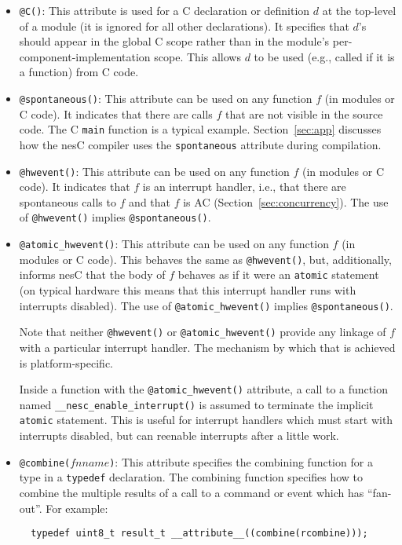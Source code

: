 \documentclass[11pt,letterpaper]{article}
\newcommand{\kw}[1]{{\tt #1}}
\newcommand{\code}[1]{{\tt #1}}
\newcommand{\nesc}{nesC\xspace}
\begin{document}
\begin{itemize}
\item \code{@C()}: This attribute is used for a C declaration or definition
$d$ at the top-level of a module (it is ignored for all other
declarations). It specifies that $d$'s should appear in the global C scope
rather than in the module's per-component-implementation scope. This allows
$d$ to be used (e.g., called if it is a function) from C code.

\item \code{@spontaneous()}: This attribute can be used on any function $f$
(in modules or C code). It indicates that there are calls $f$ that are not
visible in the source code. The C \code{main} function is a typical
example. Section~\ref{sec:app} discusses how the \nesc compiler uses the
\code{spontaneous} attribute during compilation.

\item \code{@hwevent()}: This attribute can be used on any function $f$ (in
modules or C code). It indicates that $f$ is an interrupt handler, i.e.,
that there are spontaneous calls to $f$ and that $f$ is AC
(Section~\ref{sec:concurrency}). The use of \code{@hwevent()} implies
\code{@spontaneous()}.

\item \code{@atomic\_hwevent()}: This attribute can be used on any function
$f$ (in modules or C code). This behaves the same as \code{@hwevent()}, but,
additionally, informs \nesc that the body of $f$ behaves as if it were an
\kw{atomic} statement (on typical hardware this means that this interrupt
handler runs with interrupts disabled). The use of \code{@atomic\_hwevent()}
implies \code{@spontaneous()}.

Note that neither \code{@hwevent()} or \code{@atomic\_hwevent()} provide any
linkage of $f$ with a particular interrupt handler. The mechanism by
which that is achieved is platform-specific.

Inside a function with the \code{@atomic\_hwevent()} attribute, a call to a
function named \code{\_\_nesc\_enable\_interrupt()} is assumed to terminate
the implicit \kw{atomic} statement. This is useful for interrupt handlers
which must start with interrupts disabled, but can reenable interrupts
after a little work.

\item \code{@combine($fnname$)}: This attribute specifies the combining
function for a type in a \kw{typedef} declaration. The combining function
specifies how to combine the multiple results of a call to a command
or event which has ``fan-out''. For example:
\begin{verbatim}
  typedef uint8_t result_t __attribute__((combine(rcombine)));


\end{verbatim}
\end{itemize}
\end{document}
